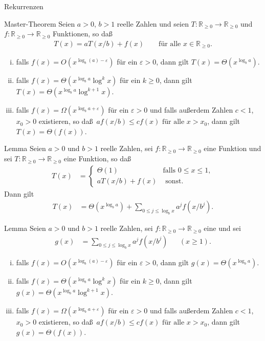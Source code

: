 \documentclass[aspectratio=1610, 11pt]{beamer}
\newcommand\RRpos{\mathbb R_{\geq0}}
\newcommand{\eps}{\varepsilon}
\begin{document}
\begin{frame}{Rekurrenzen}
	\begin{overprint}
	\begin{block}{Master-Theorem}
	Seien $a>0$, $b>1$ reelle Zahlen und seien $T:\RRpos\to\RRpos$ und $f:\RRpos\to\RRpos$ Funktionen, so da\ss
	\begin{align*}
		T(x)=aT(x/b)+f(x)\qquad\mbox{f\"ur alle }x\in\RRpos.
	\end{align*}
	\vspace{-5mm}
	\begin{enumerate}[(i)]
		\item falls $f(x)=O(x^{\log_b(a)-\eps})$ f\"ur ein $\eps>0$, dann gilt $T(x)=\Theta(x^{\log_ba})$.
		\item falls $f(x)=\Theta(x^{\log_ba}\log^kx)$ f\"ur ein $k\geq0$, dann gilt $T(x)=\Theta(x^{\log_ba}\log^{k+1}x)$.
		\item falls $f(x)=\Omega(x^{\log_ba+\eps})$ f\"ur ein $\eps>0$ und falls au\ss erdem  Zahlen $c<1$, $x_0>0$ existieren, so da\ss\ $ af(x/b)\leq cf(x)\mbox{ f\"ur alle }x>x_0$, dann gilt $T(x)=\Theta(f(x))$.
	\end{enumerate}
	\end{block}
		\begin{block}{Lemma}
	Seien $a>0$ und $b>1$ reelle Zahlen, sei $f:\RRpos\to\RRpos$ eine Funktion und sei $T:\RRpos\to\RRpos$ eine Funktion, so da\ss
	\begin{align}\label{eqlem_master1_1}
		T(x)&=\begin{cases}\Theta(1)&\mbox{falls }0\leq x\leq 1,\\ aT(x/b)+f(x)&\mbox{ sonst.}\end{cases}
	\end{align}
	Dann gilt
	\begin{align}\label{eqlem_master1}
		T(x)&=\Theta(x^{\log_ba})+\sum_{0\leq j\leq\log_bx}a^jf(x/b^j).
	\end{align}
		\end{block}
		\begin{block}{Lemma}
	Seien $a>0$ und $b>1$ reelle Zahlen, sei $f:\RRpos\to\RRpos$ eine und sei
	\begin{align}\label{eqlem_master2_1}
		g(x)&=\sum_{0\leq j\leq\log_bx}a^jf(x/b^j)&&(x\geq1).
	\end{align}
	\begin{enumerate}[(i)]
		\item falls $f(x)=O(x^{\log_b(a)-\eps})$ f\"ur ein $\eps>0$, dann gilt $g(x)=\Theta(x^{\log_ba})$.
		\item falls $f(x)=\Theta(x^{\log_ba}\log^kx)$ f\"ur ein $k\geq0$, dann gilt $g(x)=\Theta(x^{\log_ba}\log^{k+1}x)$.
		\item falls $f(x)=\Omega(x^{\log_ba+\eps})$ f\"ur ein $\eps>0$ und falls au\ss erdem  Zahlen $c<1$, $x_0>0$ existieren, so da\ss\ $af(x/b)\leq cf(x)\mbox{ f\"ur alle }x>x_0$, dann gilt $g(x)=\Theta(f(x))$.
	\end{enumerate}
		\end{block}
	\end{overprint}
\end{frame}
\end{document}
